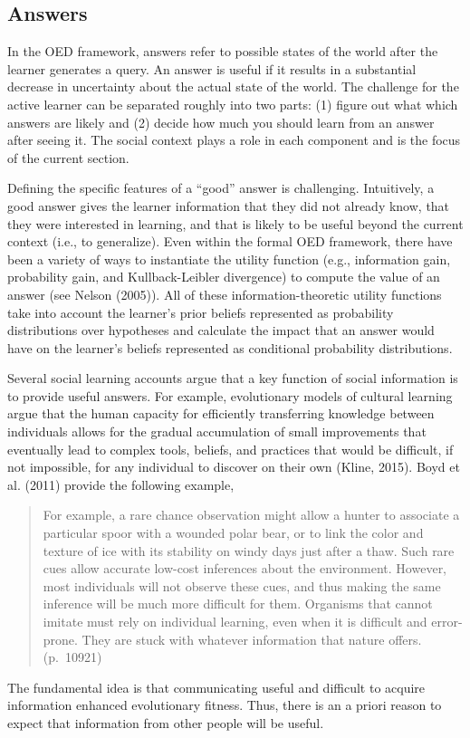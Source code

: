 \documentclass[oneside]{report}
\begin{document}
\subsection{Answers}\label{answers}

In the OED framework, answers refer to possible states of the world
after the learner generates a query. An answer is useful if it results
in a substantial decrease in uncertainty about the actual state of the
world. The challenge for the active learner can be separated roughly
into two parts: (1) figure out what which answers are likely and (2)
decide how much you should learn from an answer after seeing it. The
social context plays a role in each component and is the focus of the
current section.

Defining the specific features of a ``good'' answer is challenging.
Intuitively, a good answer gives the learner information that they did
not already know, that they were interested in learning, and that is
likely to be useful beyond the current context (i.e., to generalize).
Even within the formal OED framework, there have been a variety of ways
to instantiate the utility function (e.g., information gain, probability
gain, and Kullback-Leibler divergence) to compute the value of an answer
(see Nelson (2005)). All of these information-theoretic utility
functions take into account the learner's prior beliefs represented as
probability distributions over hypotheses and calculate the impact that
an answer would have on the learner's beliefs represented as conditional
probability distributions.

Several social learning accounts argue that a key function of social
information is to provide useful answers. For example, evolutionary
models of cultural learning argue that the human capacity for
efficiently transferring knowledge between individuals allows for the
gradual accumulation of small improvements that eventually lead to
complex tools, beliefs, and practices that would be difficult, if not
impossible, for any individual to discover on their own (Kline, 2015).
Boyd et al. (2011) provide the following example,
\begin{quote}
For example, a rare chance observation might allow a hunter to associate
a particular spoor with a wounded polar bear, or to link the color and
texture of ice with its stability on windy days just after a thaw. Such
rare cues allow accurate low-cost inferences about the environment.
However, most individuals will not observe these cues, and thus making
the same inference will be much more difficult for them. Organisms that
cannot imitate must rely on individual learning, even when it is
difficult and error-prone. They are stuck with whatever information that
nature offers. (p.~10921)
\end{quote}
\noindent
The fundamental idea is that communicating useful and difficult to
acquire information enhanced evolutionary fitness. Thus, there is an a
priori reason to expect that information from other people will be
useful.
\end{document}
